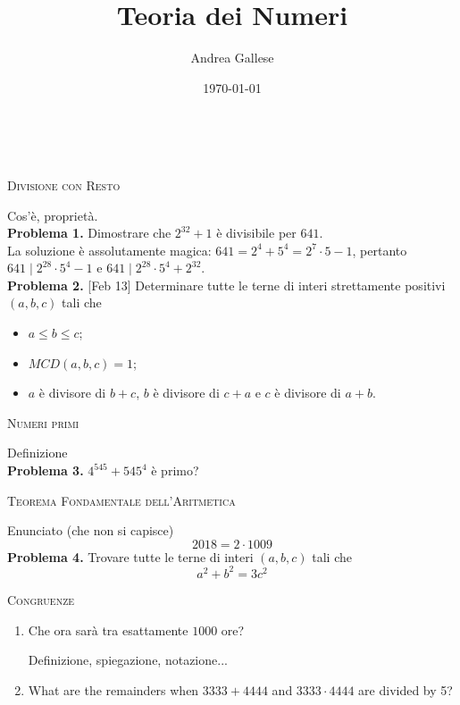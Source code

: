 \documentclass[a4paper]{article}
\title{Teoria dei Numeri}\let\Title\@title
\author{Andrea Gallese}\let\Author\@author
\date{\today}\let\Date\@date
\newcommand{\Intitola}{\begin{center}
		\vspace*{0,5 cm}
		{\Huge \textsc{\Title}} \\
		\vspace{0,5 cm}
		\textsc{\Author} \hspace{1cm} \textsc{\Date}
		\thispagestyle{empty}
		\vspace{0,7 cm}
\end{center}}
\theoremstyle{remark}
\theoremstyle{definition}
\begin{document}
\Intitola
\small

\begin{multicols}{2}


\begin{center}
	\textsc{Divisione con Resto}
\end{center}

\textsf{Cos'è, proprietà.}\\

\textbf{Problema 1.} Dimostrare che $2^{32 }+1 $ è divisibile per $ 641 $.\\

\textsf{La soluzione è assolutamente magica: $ 641 = 2^4 + 5^4 = 2^7 \cdot 5 -1 $, pertanto $ 641 \mid 2^{28}\cdot 5^4 - 1 $ e $ 641 \mid  2^{28}\cdot 5^4 + 2^{32} $.}\\

\textbf{Problema 2.} [Feb 13] Determinare tutte le terne di interi strettamente positivi $ (a, b, c) $ tali che
\begin{itemize}
	\item  $ a \leq b \leq c $;
	\item  $ MCD (a, b, c) = 1 $;
	\item  $ a $ è divisore di $ b + c $, $ b $ è divisore di $ c + a $ e $ c $ è divisore di $ a + b $.
\end{itemize}
  
  
\begin{center}
	\textsc{Numeri primi}
\end{center}
\textsf{Definizione}\\

\textbf{Problema 3.} $ 4^{545} + 545^4 $ è primo?

\begin{center}
	\textsc{Teorema Fondamentale dell'Aritmetica}
\end{center}
\textsf{Enunciato (che non si capisce)}
$$  \boxed{2018 = 2 \cdot 1009}  $$
\textbf{Problema 4.} Trovare tutte le terne di interi $ (a, b, c) $ tali che $$  a^2 + b^2 = 3c^2  $$ 
\columnbreak

\begin{center}
	\textsc{Congruenze}
\end{center}
\begin{enumerate}
	\item  Che ora sarà tra esattamente $ 1000 $ ore?
	
	\textsf{Definizione, spiegazione, notazione...}
	
	\item What are the remainders when $ 3333 + 4444 $ and $ 3333 \cdot 4444 $ are divided by 5?
	

\end{enumerate}
\end{multicols}
\end{document}
